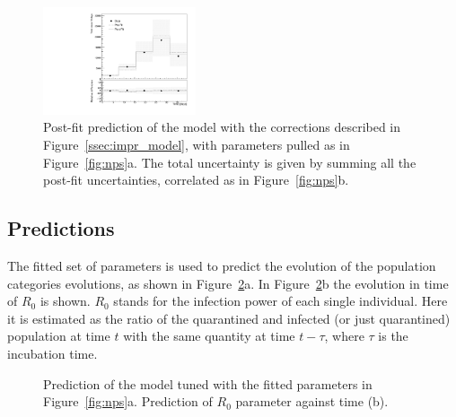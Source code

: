 \begin{figure}
\centering
\includegraphics[width=0.4\textwidth]{imgs/Covid/ModelPostFit.pdf} 
  \caption{Post-fit prediction of the model with the corrections described in Figure~\ref{ssec:impr_model}, with parameters pulled as in Figure~\ref{fig:nps}a. The total uncertainty is given by summing all the post-fit uncertainties, correlated as in Figure~\ref{fig:nps}b.}
  \label{fig:postfit}
\end{figure}

\subsection{Predictions}
The fitted set of parameters is used to predict the evolution of the population categories evolutions, as shown in Figure~\ref{fig:model_postfit}a. In Figure~\ref{fig:model_postfit}b the evolution in time of $R_0$ is shown. $R_0$ stands for the infection power of each single individual. Here it is estimated as the ratio of the quarantined and infected (or just quarantined) population at time $t$ with the same quantity at time $t-\tau$, where $\tau $ is the incubation time. \\

\begin{figure}
\centering
{}
  \caption{Prediction of the model tuned with the fitted parameters in Figure~\ref{fig:nps}a. Prediction of $R_0$ parameter against time (b).}
  \label{fig:model_postfit}
\end{figure}


